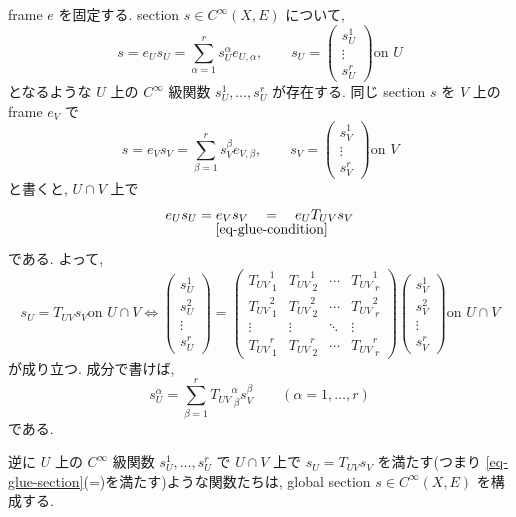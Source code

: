 \documentclass[dvipdfmx,a4paper,11pt]{article} %
\theoremstyle{definition}
\theoremstyle{remark}
\numberwithin{equation}{section}
\newcommand{\underalign}[2]{\quad \underset{\mathclap{\strut #1}}{#2}\quad}
\begin{document}
frame \(e\) を固定する. section \(s\in C^\infty(X,E)\) について,
\[
s=e_U s_U
=
\sum_{\alpha=1}^r s_U^\alpha e_{U,\alpha},
\qquad
s_U=
\begin{pmatrix}
s_U^1\\
\vdots\\
s_U^r
\end{pmatrix}
\text{on $U$}
\]
となるような \(U\) 上の \(C^{\infty}\) 級関数
\(s_U^1, \ldots,s_U^r\) が存在する. 同じ section \(s\) を \(V\) 上の frame \(e_V\) で
\[
s=e_V s_V
=
\sum_{\beta=1}^r s_V^\beta e_{V,\beta},
\qquad
s_V=
\begin{pmatrix}
s_V^1\\
\vdots\\
s_V^r
\end{pmatrix}
\text{on $V$}
\]
と書くと, \(U\cap V\) 上で
\[
e_U s_U=e_V s_V
\underalign{\eqref{eq-glue-condition}}{=}e_U T_{UV}s_V
\]
である. よって,
\begin{equation}
\label{eq-glue-section}
s_U=T_{UV}s_V
\text{on } U\cap V
\Leftrightarrow 
\begin{pmatrix}
s_U^1\\
s_U^2\\
\vdots\\
s_U^r
\end{pmatrix}
=
\begin{pmatrix}
{T_{UV}}^{1}_{\ 1} & {T_{UV}}^{1}_{\ 2}& \cdots & {T_{UV}}^{1}_{\ r}\\
{T_{UV}}^{2}_{\ 1} & {T_{UV}}^{2}_{\ 2}& \cdots & {T_{UV}}^{2}_{\ r}\\
\vdots & \vdots & \ddots & \vdots\\
{T_{UV}}^{r}_{\ 1}& {T_{UV}}^{r}_{\ 2}& \cdots & {T_{UV}}^{r}_{\ r}
\end{pmatrix}
\begin{pmatrix}
s_V^1\\
s_V^2\\
\vdots\\
s_V^r
\end{pmatrix}
\text{on } U\cap V
\end{equation}
が成り立つ. 成分で書けば,
\[
s_U^\alpha
=
\sum_{\beta=1}^r {T_{UV}}^{\alpha}_{\ \beta}s_V^\beta
\qquad
(\alpha=1,\ldots,r)
\]
である.

逆に \(U\) 上の \(C^{\infty}\) 級関数
\(s_U^1, \ldots,s_U^r\) で
\(U\cap V\) 上で \(s_U=T_{UV}s_V\) を満たす(つまり \eqref{eq-glue-section}(=)を満たす)ような関数たちは, global section \(s\in C^\infty(X,E)\) を構成する.
\end{document}

